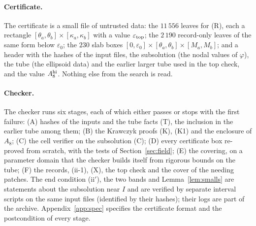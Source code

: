 \documentclass[11pt]{article}
\theoremstyle{definition}
\begin{document}
\paragraph{Certificate.} The certificate is a small file of untrusted data: the $11\,556$ leaves for (R), each a
rectangle $[\theta_a,\theta_b]\times[\kappa_a,\kappa_b]$ with a value $\varepsilon_{\rm top}$; the $2\,190$ record-only
leaves of the same form below $\varepsilon_0$; the $230$ slab boxes $[0,\varepsilon_0]\times[\theta_a,\theta_b]\times[M_a,M_b]$;
and a header with the hashes of the input files, the subsolution (the nodal values of $\varphi$), the tube (the
ellipsoid data) and the earlier larger tube used in the top check, and the value $A_8^{\rm hi}$. Nothing else from the search is read.

\paragraph{Checker.} The checker runs six stages, each of which either passes or stops with the first failure:
(A) hashes of the inputs and the tube facts (T), the inclusion in the earlier tube among them; (B) the Krawczyk proofs (K), (K1) and the enclosure of $A_8$; (C) the
cell verifier on the subsolution (C); (D) every certificate box re-proved from scratch, with the tests of
Section~\ref{sec:field}; (E) the covering, on a parameter domain that the checker builds itself from rigorous bounds
on the tube; (F) the records, (ii-1), (X), the top check and the cover of the needing patches. The end condition
(ii$'$), the two bands and Lemma~\ref{lem:smalls} are statements about the subsolution near $I$ and are verified by
separate interval scripts on the same input files (identified by their hashes); their logs are part of the archive.
Appendix~\ref{app:spec} specifies the certificate format and the postcondition of every stage.
\end{document}
